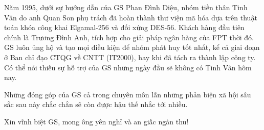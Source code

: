 Năm 1995, dưới sự hướng dẫn của GS Phan Đình Diệu, nhóm tiền thân Tinh Vân do anh Quan Son phụ trách đã hoàn thành thư viện mã hóa dựa trên thuật toán khóa công khai Elgamal-256 và đối xứng DES-56. Khách hàng đầu tiên chính là Trương Đình Anh, tích hợp cho giải pháp ngân hàng của FPT thời đó. GS luôn ủng hộ và tạo mọi điều kiện để nhóm phát huy tốt nhất, kể cả giai đoạn ở Ban chỉ đạo CTQG về CNTT (IT2000), hay khi đã tách ra thành lập công ty. Có thể nói thiếu sự hỗ trợ của GS những ngày đầu sẽ không có Tinh Vân hôm nay. 

Những đóng góp của GS cả trong chuyên môn lẫn những phản biện xã hội sâu sắc sau này chắc chắn sẽ còn được hậu thế nhắc tới nhiều. 

Xin vĩnh biệt GS, mong ông yên nghỉ và an giấc ngàn thu! 



